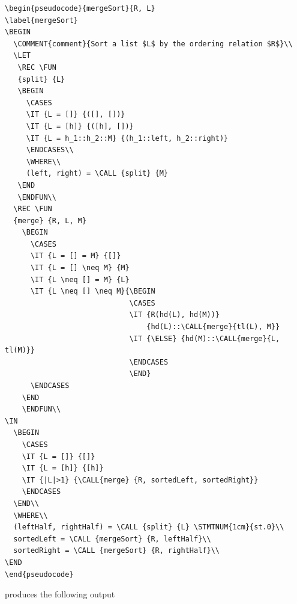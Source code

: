 \documentclass[a4]{article}
\begin{document}
\begin{verbatim}
\begin{pseudocode}{mergeSort}{R, L}
\label{mergeSort}
\BEGIN
  \COMMENT{comment}{Sort a list $L$ by the ordering relation $R$}\\
  \LET 
   \REC \FUN
   {split} {L}
   \BEGIN
     \CASES
     \IT {L = []} {([], [])} 
     \IT {L = [h]} {([h], [])} 
     \IT {L = h_1::h_2::M} {(h_1::left, h_2::right)} 
     \ENDCASES\\
     \WHERE\\
     (left, right) = \CALL {split} {M}
   \END
   \ENDFUN\\
  \REC \FUN 
  {merge} {R, L, M}
    \BEGIN
      \CASES
      \IT {L = [] = M} {[]} 
      \IT {L = [] \neq M} {M}  
      \IT {L \neq [] = M} {L}  
      \IT {L \neq [] \neq M}{\BEGIN
                             \CASES
                             \IT {R(hd(L), hd(M))}
                                 {hd(L)::\CALL{merge}{tl(L), M}} 
                             \IT {\ELSE} {hd(M)::\CALL{merge}{L, tl(M)}}
                             \ENDCASES
                             \END} 
      \ENDCASES
    \END
    \ENDFUN\\
\IN 
  \BEGIN
    \CASES
    \IT {L = []} {[]} 
    \IT {L = [h]} {[h]} 
    \IT {|L|>1} {\CALL{merge} {R, sortedLeft, sortedRight}}
    \ENDCASES
  \END\\
  \WHERE\\
  (leftHalf, rightHalf) = \CALL {split} {L} \STMTNUM{1cm}{st.0}\\
  sortedLeft = \CALL {mergeSort} {R, leftHalf}\\
  sortedRight = \CALL {mergeSort} {R, rightHalf}\\
\END
\end{pseudocode}
\end{verbatim}

\noindent{}produces the following output
\end{document}
